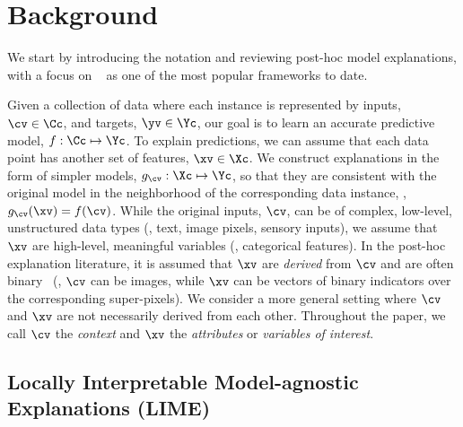 \documentclass[twoside,11pt]{article}
\begin{document}
\section{Background}
\label{sec:background}

We start by introducing the notation and reviewing post-hoc model explanations, with a focus on {\LIME}~\citep{ribeiro2016trust} as one of the most popular frameworks to date.

Given a collection of data where each instance is represented by inputs, $\cv \in \Cc$, and targets, $\yv \in \Yc$, our goal is to learn an accurate predictive model, $f: \Cc \mapsto \Yc$.
To explain predictions, we can assume that each data point has another set of features, $\xv \in \Xc$.
We construct explanations in the form of simpler models, $g_{\cv}: \Xc \mapsto \Yc$, so that they are consistent with the original model in the neighborhood of the corresponding data instance, \ie, $g_\cv(\xv) = f(\cv)$.
While the original inputs, $\cv$, can be of complex, low-level, unstructured data types (\eg, text, image pixels, sensory inputs), we assume that $\xv$ are high-level, meaningful variables (\eg, categorical features).
In the post-hoc explanation literature, it is assumed that $\xv$ are \emph{derived} from $\cv$ and are often binary~\citep{lundberg2017shap} (\eg, $\cv$ can be images, while $\xv$ can be vectors of binary indicators over the corresponding super-pixels).
We consider a more general setting where $\cv$ and $\xv$ are not necessarily derived from each other.
Throughout the paper, we call $\cv$ the \emph{context} and $\xv$ the \emph{attributes} or \emph{variables of interest}.

\subsection*{Locally Interpretable Model-agnostic Explanations (LIME)}
\label{sec:lime}
\end{document}
